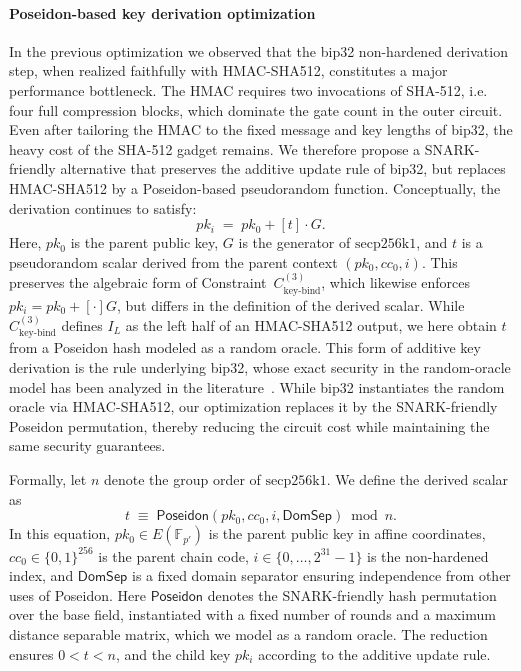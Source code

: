 \paragraph{Poseidon-based key derivation optimization}
In the previous optimization we observed that the \acrshort{bip32} non-hardened derivation step, when realized faithfully with HMAC-SHA512, constitutes a major performance bottleneck. The HMAC requires two invocations of SHA-512, i.e. four full compression blocks, which dominate the gate count in the outer circuit. Even after tailoring the HMAC to the fixed message and key lengths of \acrshort{bip32}, the heavy cost of the SHA-512 gadget remains. We therefore propose a SNARK-friendly alternative that preserves the additive update rule of \acrshort{bip32}, but replaces HMAC-SHA512 by a Poseidon-based pseudorandom function. Conceptually, the derivation continues to satisfy:
\[
pk_i \;=\; pk_0 + [t]\cdot G.
\]
Here, $pk_0$ is the parent public key, $G$ is the generator of $\mathrm{secp256k1}$, and $t$ is a pseudorandom scalar derived from the parent context $(pk_0, cc_0, i)$. This preserves the algebraic form of Constraint~$C_{\text{key-bind}}^{(3)}$, which likewise enforces $pk_i = pk_0 + [\cdot]G$, but differs in the definition of the derived scalar. While $C_{\text{key-bind}}^{(3)}$ defines $I_L$ as the left half of an HMAC-SHA512 output, we here obtain $t$ from a Poseidon hash modeled as a random oracle. This form of additive key derivation is the rule underlying \acrshort{bip32}, whose exact security in the random-oracle model has been analyzed in the literature~\cite{Das2021}. While \acrshort{bip32} instantiates the random oracle via HMAC-SHA512, our optimization replaces it by the SNARK-friendly Poseidon permutation, thereby reducing the circuit cost while maintaining the same security guarantees. 

\medskip
Formally, let $n$ denote the group order of $\mathrm{secp256k1}$. We define the derived scalar as
\[
t \;\equiv\; \mathsf{Poseidon}(pk_0, cc_0, i, \mathsf{DomSep}) \bmod n.
\]
In this equation, $pk_0 \in E(\mathbb{F}_{p'})$ is the parent public key in affine coordinates, $cc_0 \in \{0,1\}^{256}$ is the parent chain code, $i \in \{0,\dots,2^{31}-1\}$ is the non-hardened index, and $\mathsf{DomSep}$ is a fixed domain separator ensuring independence from other uses of Poseidon. Here $\mathsf{Poseidon}$ denotes the SNARK-friendly hash permutation over the base field, instantiated with a fixed number of rounds and a maximum distance separable matrix, which we model as a random oracle. The reduction ensures $0 < t < n$, and the child key $pk_i$ according to the additive update rule.

